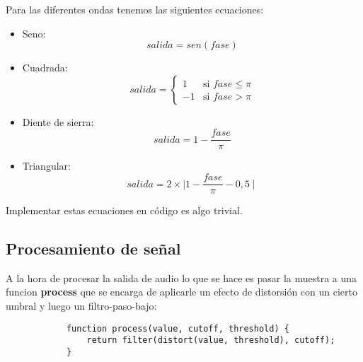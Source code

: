 \documentclass[a4paper]{article}
\begin{document}
            Para las diferentes ondas tenemos las siguientes ecuaciones:
            \begin{itemize}
                \item Seno:
                    \begin{equation*}
                        salida = sen(fase)
                    \end{equation*}
                \item Cuadrada:
                    \begin{equation*}
                    salida = \begin{cases}
                    1 &\text{si $fase\leq\pi$}\\
                    -1 &\text{si $fase>\pi$}
                    \end{cases}
                    \end{equation*}
                \item Diente de sierra:
                    \begin{equation*}
                        salida = 1 -
                         \frac{fase}{\pi}
                    \end{equation*}
                \item Triangular:
                    \begin{equation*}
                        salida = 2
                         \times \mid 1 - \frac{fase}{\pi} - 0,5 \mid
                    \end{equation*}
            \end{itemize}

            Implementar estas ecuaciones en código
            es algo trivial.

        \subsection{Procesamiento de señal}
            A la hora de procesar la salida de audio lo que se hace
            es pasar la muestra a una funcion \textbf{process} que
            se encarga de aplicarle un efecto de distorsión con un
            cierto umbral y luego un filtro-paso-bajo:

            \begin{verbatim}
            function process(value, cutoff, threshold) {
                return filter(distort(value, threshold), cutoff);
            }
            \end{verbatim}
\end{document}
